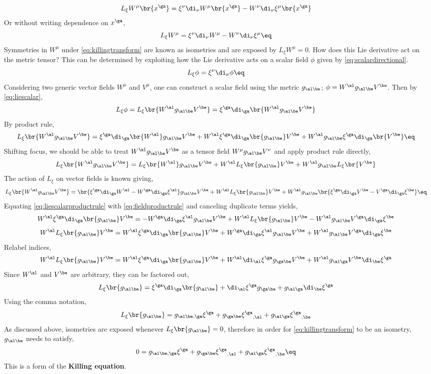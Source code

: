 \documentclass{article}
\begin{document}
\[ L_\xi W^\mu \br{x^\ga} = \xi^\nu \di_\nu  W^\mu \br{x^\ga}-W^\nu \di_\nu \xi^\mu \br{x^\ga} \]
Or without writing dependence on $x^\ga$,
\[ L_\xi W^\mu = \xi^\nu \di_\nu  W^\mu - W^\nu \di_\nu \xi^\mu \eq \label{eq:liederivativevector} \]
Symmetries in $W^\mu$ under \eqref{eq:killingtransform} are known as isometries and are exposed by $L_\xi W^\mu = 0$. How does this Lie derivative act on the metric tensor? This can be determined by exploiting how the Lie derivative acts on a scalar field $\phi$ given by \eqref{eq:scalardirectional}.
\[ L_\xi \phi = \xi^\nu \di_\nu \phi \eq \label{eq:liescalar} \]
Considering two generic vector fields $W^\mu$ and $V^\mu$, one can construct a scalar field using the metric $g_{\al\be}$; $\phi = W^\al g_{\al\be} V^\be$.
Then by \eqref{eq:liescalar},
\[ L_\xi \phi = L_\xi \br{W^\al g_{\al\be} V^\be} = \xi^\ga \di_\ga \br{W^\al g_{\al\be} V^\be} \]
By product rule,
\[ L_\xi \br{W^\al g_{\al\be} V^\be} = \xi^\ga \di_\ga \br{W^\al} g_{\al\be} V^\be + W^\al \xi^\ga \di_\ga \br{g_{\al\be}} V^\be + W^\al g_{\al\be} \xi^\ga \di_\ga \br{V^\be} \eq \label{eq:liescalarproductrule}\]
Shifting focus, we should be able to treat $W^\al g_{\al\be} V^\be$ as a tensor field $W^\mu g_{\al\be} V^\nu$ and apply product rule directly,
\[ L_\xi \br{W^\al g_{\al\be} V^\be} = L_\xi \br{W^\al} g_{\al\be} V^\be + W^\al L_\xi \br{g_{\al\be}} V^\be + W^\al g_{\al\be} L_\xi \br{V^\be} \]
The action of $L_\xi$ on vector fields is known giving,
\[ L_\xi \br{W^\al g_{\al\be} V^\be} = \br{\xi^\ga \di_\ga  W^\al - W^\ga \di_\ga \xi^\al} g_{\al\be} V^\be + W^\al L_\xi \br{g_{\al\be}} V^\be + W^\al g_{\al\be} \br{\xi^\ga \di_\ga  V^\be - V^\ga \di_\ga \xi^\be} \eq \label{eq:fieldproductrule} \]
Equating \eqref{eq:liescalarproductrule} with \eqref{eq:fieldproductrule} and canceling duplicate terms yields,
\[ W^\al \xi^\ga \di_\ga \br{g_{\al\be}} V^\be = - W^\ga \di_\ga \xi^\al g_{\al\be} V^\be + W^\al L_\xi \br{g_{\al\be}} V^\be - W^\al g_{\al\be} V^\ga \di_\ga \xi^\be \]
\[ W^\al L_\xi \br{g_{\al\be}} V^\be = W^\al \xi^\ga \di_\ga \br{g_{\al\be}} V^\be + W^\ga \di_\ga \xi^\al g_{\al\be} V^\be + W^\al g_{\al\be} V^\ga \di_\ga \xi^\be \]
Relabel indices,
\[ W^\al L_\xi \br{g_{\al\be}} V^\be = W^\al \xi^\ga \di_\ga \br{g_{\al\be}} V^\be + W^\al \di_\al \xi^\ga g_{\ga\be} V^\be + W^\al g_{\al\ga} V^\be \di_\be \xi^\ga \]
Since $W^\al$ and $V^\be$ are arbitrary, they can be factored out,
\[ L_\xi \br{g_{\al\be}} = \xi^\ga \di_\ga \br{g_{\al\be}} + \di_\al \xi^\ga g_{\ga\be} + g_{\al\ga} \di_\be \xi^\ga \]
Using the comma notation,
\[ L_\xi \br{g_{\al\be}} =  g_{\al\be,\ga} \xi^\ga + g_{\ga\be} {\xi^\ga}_{,\al} + g_{\al\ga} {\xi^\ga}_{,\be} \]
As discussed above, isometries are exposed whenever $L_\xi \br{g_{\al\be}} = 0$, therefore in order for \eqref{eq:killingtransform} to be an isometry, $g_{\al\be}$ needs to satisfy,
\[ 0 =  g_{\al\be,\ga} \xi^\ga + g_{\ga\be} {\xi^\ga}_{,\al} + g_{\al\ga} {\xi^\ga}_{,\be} \eq \label{eq:21} \]
This is a form of the \textbf{Killing equation}.
\end{document}
